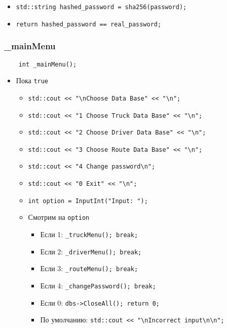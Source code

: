 \begin{itemize}
    \item \verb|std::string hashed_password = sha256(password);|
    \item \verb|return hashed_password == real_password;|
\end{itemize}

\subsubsection{\_mainMenu}

\begin{lstlisting}
    int _mainMenu();
\end{lstlisting}

\begin{itemize}
    \item Пока \verb|true|
    \begin{itemize}
        \item \verb|std::cout << "\nChoose Data Base" << "\n";|
        \item \verb|std::cout << "1 Choose Truck Data Base" << "\n";|
        \item \verb|std::cout << "2 Choose Driver Data Base" << "\n";|
        \item \verb|std::cout << "3 Choose Route Data Base" << "\n";|
        \item \verb|std::cout << "4 Change password\n";|
        \item \verb|std::cout << "0 Exit" << "\n";|
        \item \verb|int option = InputInt("Input: ");|
        \item Смотрим на \verb|option|
        \begin{itemize}
            \item Если 1: \verb|_truckMenu(); break;|
            \item Если 2: \verb|_driverMenu(); break;|
            \item Если 3: \verb|_routeMenu(); break;|
            \item Если 4: \verb|_changePassword(); break;|
            \item Если 0: \verb|dbs->CloseAll(); return 0;|
            \item По умолчанию: \verb|std::cout << "\nIncorrect input\n\n";|
        \end{itemize}
    \end{itemize}
\end{itemize}

